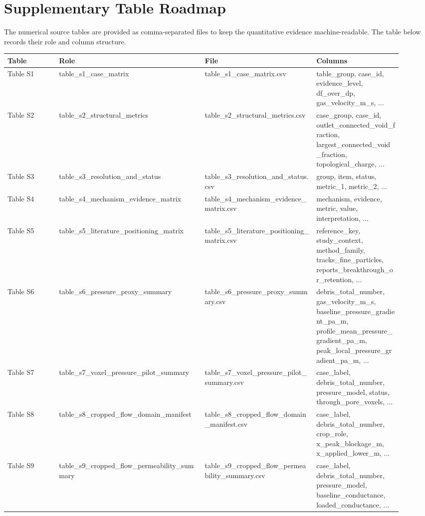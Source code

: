 \documentclass[11pt]{article}
\begin{document}
\section*{Supplementary Table Roadmap}
The numerical source tables are provided as comma-separated files to keep the quantitative evidence machine-readable. The table below records their role and column structure.
\footnotesize
\begin{longtable}{P{0.12\linewidth}P{0.34\linewidth}P{0.26\linewidth}P{0.20\linewidth}}
\toprule
Table & Role & File & Columns \\
\midrule
\endhead
Table S1 & table\_s1\_case\_matrix & table\_s1\_case\_matrix.csv & table\_group, case\_id, evidence\_level, df\_over\_dp, gas\_velocity\_m\_s, ... \\
Table S2 & table\_s2\_structural\_metrics & table\_s2\_structural\_metrics.csv & case\_group, case\_id, outlet\_connected\_void\_fraction, largest\_connected\_void\_fraction, topological\_charge, ... \\
Table S3 & table\_s3\_resolution\_and\_status & table\_s3\_resolution\_and\_status.csv & group, item, status, metric\_1, metric\_2, ... \\
Table S4 & table\_s4\_mechanism\_evidence\_matrix & table\_s4\_mechanism\_evidence\_matrix.csv & mechanism, evidence, metric, value, interpretation, ... \\
Table S5 & table\_s5\_literature\_positioning\_matrix & table\_s5\_literature\_positioning\_matrix.csv & reference\_key, study\_context, method\_family, tracks\_fine\_particles, reports\_breakthrough\_or\_retention, ... \\
Table S6 & table\_s6\_pressure\_proxy\_summary & table\_s6\_pressure\_proxy\_summary.csv & debris\_total\_number, gas\_velocity\_m\_s, baseline\_pressure\_gradient\_pa\_m, profile\_mean\_pressure\_gradient\_pa\_m, peak\_local\_pressure\_gradient\_pa\_m, ... \\
Table S7 & table\_s7\_voxel\_pressure\_pilot\_summary & table\_s7\_voxel\_pressure\_pilot\_summary.csv & case\_label, debris\_total\_number, pressure\_model, status, through\_pore\_voxels, ... \\
Table S8 & table\_s8\_cropped\_flow\_domain\_manifest & table\_s8\_cropped\_flow\_domain\_manifest.csv & case\_label, debris\_total\_number, crop\_role, x\_peak\_blockage\_m, x\_applied\_lower\_m, ... \\
Table S9 & table\_s9\_cropped\_flow\_permeability\_summary & table\_s9\_cropped\_flow\_permeability\_summary.csv & case\_label, debris\_total\_number, pressure\_model, baseline\_conductance, loaded\_conductance, ... \\

\end{longtable}
\end{document}
